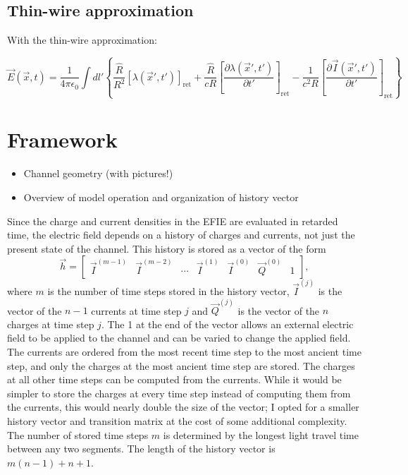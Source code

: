 \documentclass{article}
\begin{document}
\subsection{Thin-wire approximation}
With the thin-wire approximation:

\begin{equation}
\label{EFIE1d}
\vec{E}(\vec{x}, t) = \frac{1}{4\pi\epsilon_0} \int dl' \left\{ \frac{\hat{R}}{R^2} \left[\lambda(\vec{x}', t')\right]_\text{ret} + \frac{\hat{R}}{cR} \left[\frac{\partial\lambda(\vec{x}', t')}{\partial t'}\right]_\text{ret} - \frac{1}{c^2R} \left[\frac{\partial\vec{I}(\vec{x}', t')}{\partial t'}\right]_\text{ret}\right\}
\end{equation}

\section{Framework}
\begin{itemize}
\item Channel geometry (with pictures!)
\item Overview of model operation and organization of history vector
\end{itemize}

Since the charge and current densities in the EFIE are evaluated in retarded time, the electric field depends on a history of charges and currents, not just the present state of the channel. This history is stored as a vector of the form
\begin{equation}
\vec{h} = 
\begin{bmatrix}
\vec{I}^{(m-1)} & \vec{I}^{(m-2)} & \cdots & \vec{I}^{(1)} & \vec{I}^{(0)} & \vec{Q}^{(0)} & 1
\end{bmatrix},
\end{equation}
where $m$ is the number of time steps stored in the history vector, $\vec{I}^{(j)}$ is the vector of the $n-1$ currents at time step $j$ and $\vec{Q}^{(j)}$ is the vector of the $n$ charges at time step $j$. The 1 at the end of the vector allows an external electric field to be applied to the channel and can be varied to change the applied field. The currents are ordered from the most recent time step to the most ancient time step, and only the charges at the most ancient time step are stored. The charges at all other time steps can be computed from the currents. While it would be simpler to store the charges at every time step instead of computing them from the currents, this would nearly double the size of the vector; I opted for a smaller history vector and transition matrix at the cost of some additional complexity. The number of stored time steps $m$ is determined by the longest light travel time between any two segments. The length of the history vector is $m(n-1)+n+1$.
\end{document}
